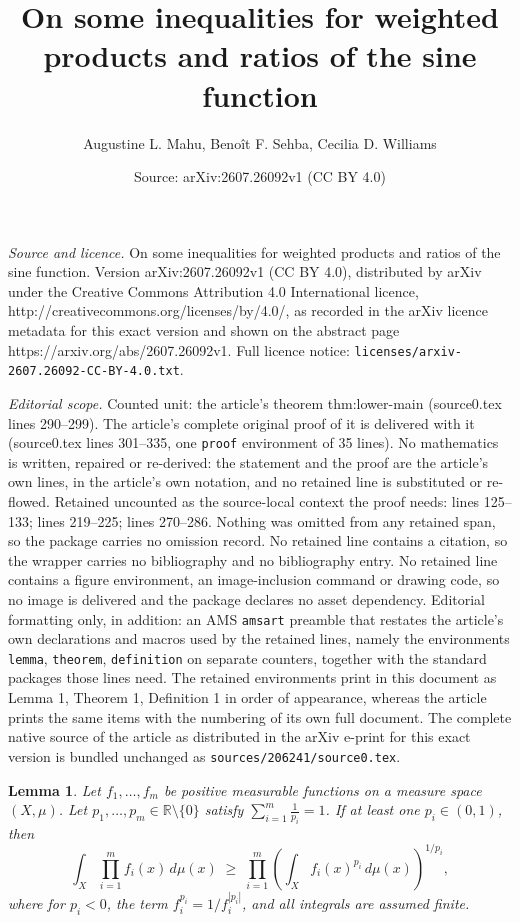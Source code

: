 \documentclass[10pt,a4paper]{amsart}
\title{On some inequalities for weighted products and ratios of the sine function}
\author{Augustine L. Mahu, Beno\^it F. Sehba, Cecilia D. Williams}
\date{Source: arXiv:2607.26092v1 (CC BY 4.0)}
\newtheorem{lemma}{Lemma}
\begin{document}
\maketitle

\noindent\emph{Source and licence.} On some inequalities for weighted products and ratios of the sine function. Version arXiv:2607.26092v1 (CC BY 4.0), distributed by arXiv under the Creative Commons Attribution 4.0 International licence, http://creativecommons.org/licenses/by/4.0/, as recorded in the arXiv licence metadata for this exact version and shown on the abstract page https://arxiv.org/abs/2607.26092v1. Full licence notice: \texttt{licenses/arxiv-2607.26092-CC-BY-4.0.txt}.\par\smallskip

\noindent\textit{Editorial scope.} Counted unit: the article's theorem thm:lower-main (source0.tex lines 290--299). The article's complete original proof of it is delivered with it (source0.tex lines 301--335, one \texttt{proof} environment of 35 lines). No mathematics is written, repaired or re-derived: the statement and the proof are the article's own lines, in the article's own notation, and no retained line is substituted or re-flowed.  Retained uncounted as the source-local context the proof needs: lines 125--133; lines 219--225; lines 270--286.  Nothing was omitted from any retained span, so the package carries no omission record.  No retained line contains a citation, so the wrapper carries no bibliography and no bibliography entry.  No retained line contains a figure environment, an image-inclusion command or drawing code, so no image is delivered and the package declares no asset dependency.  Editorial formatting only, in addition: an AMS \texttt{amsart} preamble that restates the article's own declarations and macros used by the retained lines, namely the environments \texttt{lemma}, \texttt{theorem}, \texttt{definition} on separate counters, together with the standard packages those lines need.  The retained environments print in this document as Lemma 1, Theorem 1, Definition 1 in order of appearance, whereas the article prints the same items with the numbering of its own full document.  The complete native source of the article as distributed in the arXiv e-print for this exact version is bundled unchanged as \texttt{sources/206241/source0.tex}.
\begin{lemma}\label{lem:reverseholder}
Let $f_1, \dots, f_m$ be positive measurable functions on a measure space $(X, \mu)$.
Let $p_1, \dots, p_m \in \mathbb{R} \setminus \{0\}$ satisfy $\displaystyle\sum_{i=1}^m \frac{1}{p_i} = 1$.
If at least one $p_i \in (0,1)$, then
\[
\int_X \prod_{i=1}^m f_i(x) \, d\mu(x) \;\ge\; \prod_{i=1}^m \left( \int_X f_i(x)^{p_i} \, d\mu(x) \right)^{1/p_i},
\]
where for $p_i < 0$, the term $f_i^{p_i} = 1 / f_i^{|p_i|}$, and all integrals are assumed finite.
\end{lemma}
\end{document}
